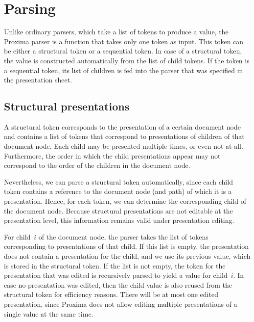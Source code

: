 \documentclass[12pt]{article}
\begin{document}
%
\section{Parsing}\label{sect:parser}
%

Unlike ordinary parsers, which take a list of tokens to produce a value, the Proxima parser is a function that takes only one token as input. This token can be either a structural token or a sequential token. In case of a structural token, the value is constructed automatically from the list of child tokens. If the token is a sequential token, its list of children is fed into the parser that was specified in the presentation sheet.

\subsection{Structural presentations}\label{subsect:parsingStructural}

A structural token corresponds to the presentation of a certain document node and contains a list of tokens that correspond to presentations of children of that document node. Each child may be presented multiple times, or even not at all. Furthermore, the order in which the child presentations appear may not correspond to the order of the children in the document node.

Nevertheless, we can parse a structural token automatically, since each child token contains a  reference to the document node (and path) of which it is a presentation. Hence, for each token, we can determine the corresponding child of the document node. Because structural presentations are not editable at the presentation level, this information remains valid under presentation editing.

For child~$i$ of the document node, the parser takes the list of tokens corresponding to presentations of that child. If this list is empty, the presentation does not contain a presentation for the child, and we use its previous value, which is stored in the structural token. If the list is not empty, the token for the presentation that was edited is recursively parsed to yield a value for child~$i$. In case no presentation was edited, then the child value is also reused from the structural token for efficiency reasons. There will be at most one edited presentation, since Proxima does not allow editing multiple presentations of a single value at the same time. 
\end{document}
